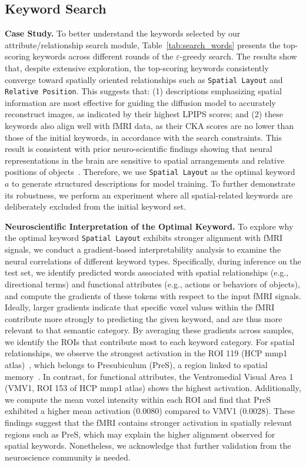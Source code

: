 \subsection{Keyword Search}
\textbf{Case Study.} To better understand the keywords selected by our attribute/relationship search module, Table~\ref{tab:search_words} presents the top-scoring keywords across different rounds of the $\varepsilon$-greedy search.
The results show that, despite extensive exploration, the top-scoring keywords consistently converge toward spatially oriented relationships such as \texttt{Spatial Layout} and \texttt{Relative Position}. This suggests that: (1) descriptions emphasizing spatial information are most effective for guiding the diffusion model to accurately reconstruct images, as indicated by their highest LPIPS scores; and (2) these keywords also align well with fMRI data, as their CKA scores are no lower than those of the initial keywords, in accordance with the search constraints. This result is consistent with prior neuro-scientific findings showing that neural representations in the brain are sensitive to spatial arrangements and relative positions of objects~\citep{zopf2018representing, graumann2022spatiotemporal}. Therefore,  we use \texttt{Spatial Layout} as the optimal keyword $a$ to generate structured descriptions for model training. To further demonstrate its robustness, we perform an experiment where all spatial-related keywords are deliberately excluded from the initial keyword set.


{
\color{black}
\textbf{Neuroscientific Interpretation of the Optimal Keyword.} To explore why the optimal keyword \texttt{Spatial Layout} exhibits stronger alignment with fMRI signals, we conduct a gradient-based interpretability analysis to examine the neural correlations of different keyword types. Specifically, during inference on the test set, we identify predicted words associated with spatial relationships (e.g., directional terms) and functional attributes (e.g., actions or behaviors of objects), and compute the gradients of these tokens with respect to the input fMRI signals. Ideally, larger gradients indicate that specific voxel values within the fMRI contribute more strongly to predicting the given keyword, and are thus more relevant to that semantic category. By averaging these gradients across samples, we identify the ROIs that contribute most to each keyword category. For spatial relationships, we observe the strongest activation in the ROI 119 (HCP mmp1 atlas)~\citep{glasser2016multi}, which belongs to Presubiculum (PreS), a region linked to spatial memory~\citep{dalton2017pre, boecker2024hippocampal}. In contrast, for functional attributes, the Ventromedial Visual Area 1 (VMV1, ROI 153 of HCP mmp1 atlas) shows the highest activation. Additionally, we compute the mean voxel intensity within each ROI and find that PreS exhibited a higher mean activation (0.0080) compared to VMV1 (0.0028). These findings suggest that the fMRI contains stronger activation in spatially relevant regions such as PreS, which may explain the higher alignment observed for spatial keywords. Nonetheless, we acknowledge that further validation from the neuroscience community is needed.
}
